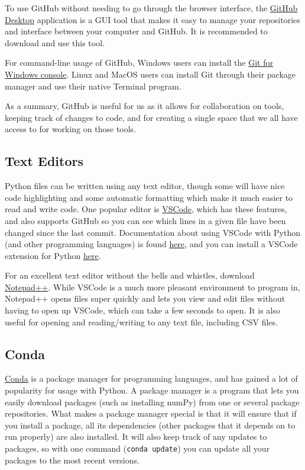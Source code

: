 \documentclass[letterpaper, 12pt]{article}
\begin{document}
To use GitHub without needing to go through the browser interface, the \href{https://desktop.github.com/}{GitHub Desktop} application is a GUI tool that makes it easy to manage your repositories and interface between your computer and GitHub. It is recommended to download and use this tool.

For command-line usage of GitHub, Windows users can install the \href{https://gitforwindows.org/}{Git for Windows console}. Linux and MacOS users can install Git through their package manager and use their native Terminal program.

As a summary, GitHub is useful for us as it allows for collaboration on tools, keeping track of changes to code, and for creating a single space that we all have access to for working on those tools.

\subsection{Text Editors}
Python files can be written using any text editor, though some will have nice code highlighting and some automatic formatting which make it much easier to read and write code. One popular editor is \href{https://code.visualstudio.com/}{VSCode}, which has these features, and also supports GitHub so you can see which lines in a given file have been changed since the last commit. Documentation about using VSCode with Python (and other programming languages) is found \href{https://code.visualstudio.com/docs/languages/python}{here}, and you can install a VSCode extension for Python \href{https://marketplace.visualstudio.com/items?itemName=ms-python.python}{here}.

For an excellent text editor without the bells and whistles, download \href{https://notepad-plus-plus.org/}{Notepad++}. While VSCode is a much more pleasant environment to program in, Notepad++ opens files super quickly and lets you view and edit files without having to open up VSCode, which can take a few seconds to open. It is also useful for opening and reading/writing to any text file, including CSV files.

\subsection{Conda}\label{anaconda}
\href{https://docs.conda.io/projects/conda/en/latest/index.html}{Conda} is a package manager for programming languages, and has gained a lot of popularity for usage with Python. A package manager is a program that lets you easily download packages (such as installing numPy) from one or several package repositories. What makes a package manager special is that it will ensure that if you install a package, all its dependencies (other packages that it depends on to run properly) are also installed. It will also keep track of any updates to packages, so with one command (\lstinline{conda update}) you can update all your packages to the most recent versions.
\end{document}

